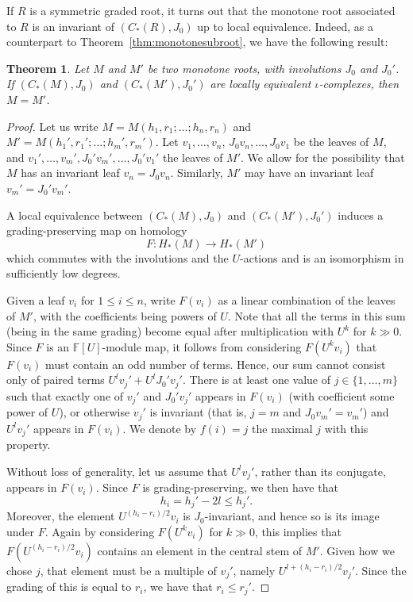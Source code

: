 \documentclass[11 pt]{amsart}
\newtheorem {theorem}{Theorem}[section]
\theoremstyle{remark}
\def\ff {{\mathbb{F}}}
\def\inv{\iota}
\begin{document}
If $R$ is a symmetric graded root, it turns out that the monotone root associated to $R$ is an invariant of $(C_*(R), J_0)$ up to local equivalence. Indeed, as a counterpart to Theorem~\ref{thm:monotonesubroot}, we have the following result:

\begin{theorem}
\label{thm:localeq}
Let $M$ and $M'$ be two monotone roots, with involutions $J_0$ and $J_0'$. If $(C_*(M), J_0)$ and $(C_*(M'), J_0')$ are locally equivalent $\inv$-complexes, then $M=M'$.
\end{theorem}

\begin{proof}
Let us write $M=M(h_1, r_1; \dots; h_n, r_n)$ and $M'=M(h_1', r_1'; \dots; h_m', r_m').$ Let $v_1, \dots, v_n$, $J_0v_n, \dots, J_0v_1$ be the leaves of $M$, and $v_1', \dots, v_m', J_0'v_m', \dots, J_0'v_1'$ the leaves of $M'$. We allow for the possibility that $M$ has an invariant leaf $v_n = J_0 v_n$. Similarly, $M'$ may have an invariant leaf $v_m' = J_0' v_m'$. 

A local equivalence between $(C_*(M), J_0)$ and $(C_*(M'), J_0')$ induces a grading-preserving map on homology
$$ F: H_*(M) \to H_*(M')$$
which commutes with the involutions and the $U$-actions and is an isomorphism in sufficiently low degrees. 

Given a leaf $v_i$ for $1\leq i\leq n$, write $F(v_i)$ as a linear combination of the leaves of $M'$, with the coefficients being powers of $U$. Note that all the terms in this sum (being in the same grading) become equal after multiplication with $U^k$ for $k \gg 0$. Since $F$ is an $\ff[U]$-module map, it follows from considering $F(U^k v_i)$ that $F(v_i)$ must contain an odd number of terms. Hence, our sum cannot consist only of paired terms $U^l v_j' + U^l J_0' v_j'$.  There is at least one value of $j \in \{1, \dots, m\}$ such that exactly one of $v_j'$ and $J_0'v_j'$ appears in $F(v_i)$ (with coefficient some power of $U$), or otherwise  $v_j'$ is invariant (that is, $j=m$ and $J_0 v_m' = v_m'$) and $U^l v_j'$ appears in $F(v_i)$. We denote by $f(i)=j$ the maximal $j$ with this property.

Without loss of generality, let us assume that $U^l v_j'$, rather than its conjugate, appears in $F(v_i)$. Since $F$ is grading-preserving, we then have that
$$h_i = h_j' - 2l \leq h_j'.$$ 
Moreover, the element $U^{(h_i - r_i)/2} v_i$ is $J_0$-invariant, and hence so is its image under $F$. Again by considering $F(U^kv_i)$ for $k \gg 0$, this implies that $F(U^{(h_i - r_i)/2} v_i)$ contains an element in the central stem of $M'$. Given how we chose $j$, that element must be a multiple of $v_j'$, namely $U^{l+(h_i - r_i)/2} v_j'$. Since the grading of this is equal to $r_i$, we have that $r_i \leq r_j'$.


\end{proof}
\end{document}
